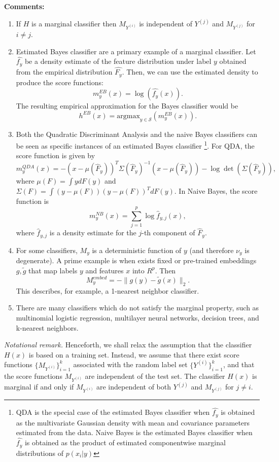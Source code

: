 \documentclass[12pt]{article}
\begin{document}
\textbf{Comments:}
\begin{enumerate}
\item If $H$ is a marginal classifier then 
$M_{Y^{(i)}}$ is independent of $Y^{(j)}$ and $M_{Y^{(j)}}$ for $i \neq j$.
\item Estimated Bayes
classifier are a primary example of a marginal classifier. Let $\hat{f_y}$ be a density estimate of the feature distribution under label $y$ obtained from the
empirical distribution $\hat{F_y}$. Then, we can use the estimated
density to produce the score functions:
\[ m^{EB}_y(x) = \log(\hat{f_{y}}(x)).\]
The resulting empirical approximation for the Bayes classifier would be
\[ h^{EB}(x) = \text{argmax}_{y \in \mathcal{S}}(m^{EB}_y(x)).\]
\item Both the Quadratic Discriminant Analysis and the naive Bayes classifiers can be seen as specific instances of an estimated Bayes classifier
\footnote{QDA is the special case of the estimated Bayes classifier when $\hat{f_y}$ is obtained as
the multivariate Gaussian density with mean and covariance parameters estimated from the data.
Naive Bayes is the estimated Bayes classifier when $\hat{f_y}$ is obtained as the product of estimated componentwise marginal distributions
of $p(x_i|y)$}. 
For QDA, the score function is
given by
\[
m_y^{QDA}(x) = -(x - \mu(\hat{F}_y))^T \Sigma(\hat{F}_y)^{-1} (x-\mu(\hat{F}_y)) - \log\det(\Sigma(\hat{F}_y)),
\]
where $\mu(F) = \int y dF(y)$ and $\Sigma(F) = \int (y-\mu(F))(y-\mu(F))^T dF(y)$.
In Naive Bayes, the score function is
\[
m^{NB}_y(x) = \sum_{j=1}^p \log \hat{f}_{y, j}(x),
\]
where $\hat{f}_{y, j}$ is a density estimate for the $j$-th component of
$\hat{F}_y$.
\item For some classifiers, $M_y$ is a deterministic function of $y$ (and therefore $\nu_y$ is degenerate). A prime example is when exists fixed or pre-trained embeddings $g, \tilde{g}$ that map labels $y$ and features $x$ into
 $R^p$. Then 
\begin{equation}
M_y^{embed} = -\|g(y) - \tilde{g}(x)\|_2.
\end{equation}
This describes, for example, a 1-nearest neighbor classifier.
\item There are many classifiers which do not satisfy the marginal property, such as multinomial logistic regression, multilayer neural networks, decision trees, and k-nearest neighbors.
\end{enumerate}

\emph{Notational remark.}  Henceforth, we shall relax the assumption that the classifier $H(x)$ is based on a training set.  Instead, we assume that there exist score functions $\{M_{Y^{(i)}}\}_{i=1}^k$ associated with the random label set $\{Y^{(i)}\}_{i=1}^k$, and that the score functions $M_{Y^{(i)}}$ are independent of the test set.  The classifier $H(x)$ is marginal if and only if $M_{Y^{(i)}}$ are independent of both $Y^{(j)}$ and $M_{Y^{(j)}}$ for $j \neq i$.
\end{document}
